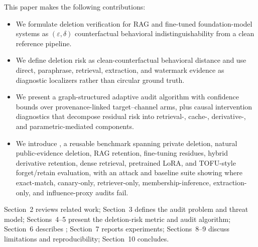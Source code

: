 This paper makes the following contributions:
\begin{itemize}
\item We formulate deletion verification for RAG and fine-tuned foundation-model systems as $(\varepsilon,\delta)$ counterfactual behavioral indistinguishability from a clean reference pipeline.
\item We define deletion risk as clean-counterfactual behavioral distance and use direct, paraphrase, retrieval, extraction, and watermark evidence as diagnostic localizers rather than circular ground truth.
\item We present a graph-structured adaptive audit algorithm with confidence bounds over provenance-linked target--channel arms, plus causal intervention diagnostics that decompose residual risk into retrieval-, cache-, derivative-, and parametric-mediated components.
\item We introduce \bench{}, a reusable benchmark spanning private deletion, natural public-evidence deletion, RAG retention, fine-tuning residues, hybrid derivative retention, dense retrieval, pretrained LoRA, and TOFU-style forget/retain evaluation, with an attack and baseline suite showing where exact-match, canary-only, retriever-only, membership-inference, extraction-only, and influence-proxy audits fail.
\end{itemize}

\noindent Section~2 reviews related work; Section~3 defines the audit problem and threat model; Sections~4--5 present the deletion-risk metric and audit algorithm; Section~6 describes \bench{}; Section~7 reports experiments; Sections~8--9 discuss limitations and reproducibility; Section~10 concludes.
